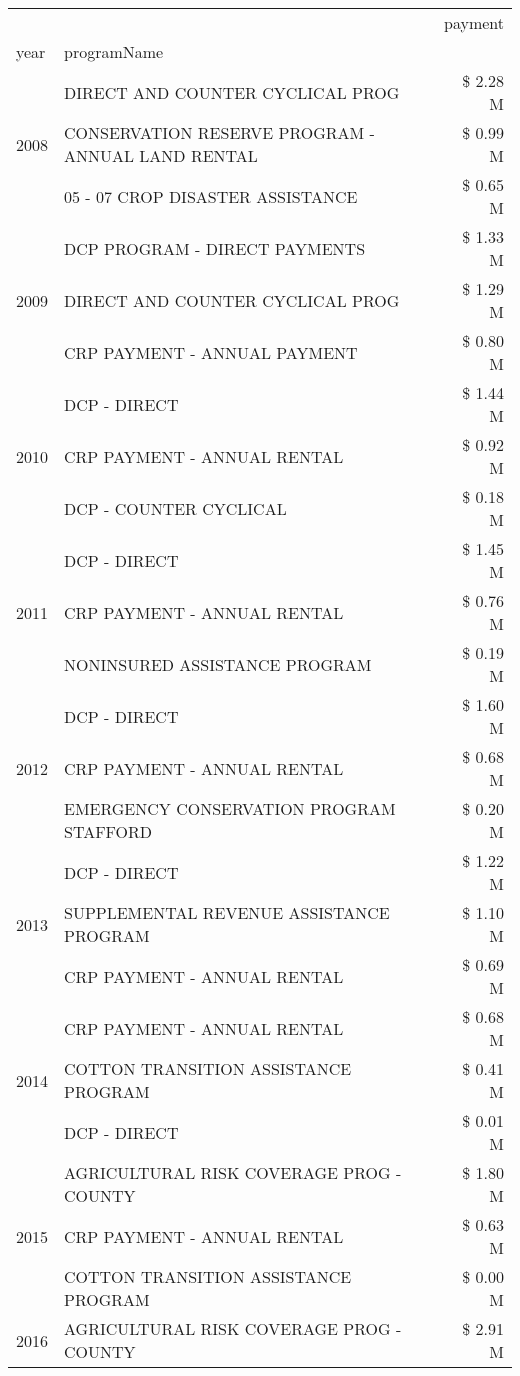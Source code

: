 \begin{tabular}{llr}
\toprule
 &  & payment \\
year & programName &  \\
\midrule
\multirow[t]{3}{*}{2008} & DIRECT AND COUNTER CYCLICAL PROG & \$ 2.28 M \\
 & CONSERVATION RESERVE PROGRAM - ANNUAL LAND RENTAL & \$ 0.99 M \\
 & 05 - 07 CROP DISASTER ASSISTANCE & \$ 0.65 M \\
\cline{1-3}
\multirow[t]{3}{*}{2009} & DCP PROGRAM - DIRECT PAYMENTS & \$ 1.33 M \\
 & DIRECT AND COUNTER CYCLICAL PROG & \$ 1.29 M \\
 & CRP PAYMENT - ANNUAL PAYMENT & \$ 0.80 M \\
\cline{1-3}
\multirow[t]{3}{*}{2010} & DCP - DIRECT & \$ 1.44 M \\
 & CRP PAYMENT - ANNUAL RENTAL & \$ 0.92 M \\
 & DCP - COUNTER CYCLICAL & \$ 0.18 M \\
\cline{1-3}
\multirow[t]{3}{*}{2011} & DCP - DIRECT & \$ 1.45 M \\
 & CRP PAYMENT - ANNUAL RENTAL & \$ 0.76 M \\
 & NONINSURED ASSISTANCE PROGRAM & \$ 0.19 M \\
\cline{1-3}
\multirow[t]{3}{*}{2012} & DCP - DIRECT & \$ 1.60 M \\
 & CRP PAYMENT - ANNUAL RENTAL & \$ 0.68 M \\
 & EMERGENCY CONSERVATION PROGRAM STAFFORD & \$ 0.20 M \\
\cline{1-3}
\multirow[t]{3}{*}{2013} & DCP - DIRECT & \$ 1.22 M \\
 & SUPPLEMENTAL REVENUE ASSISTANCE PROGRAM & \$ 1.10 M \\
 & CRP PAYMENT - ANNUAL RENTAL & \$ 0.69 M \\
\cline{1-3}
\multirow[t]{3}{*}{2014} & CRP PAYMENT - ANNUAL RENTAL & \$ 0.68 M \\
 & COTTON TRANSITION ASSISTANCE PROGRAM & \$ 0.41 M \\
 & DCP - DIRECT & \$ 0.01 M \\
\cline{1-3}
\multirow[t]{3}{*}{2015} & AGRICULTURAL RISK COVERAGE PROG - COUNTY & \$ 1.80 M \\
 & CRP PAYMENT - ANNUAL RENTAL & \$ 0.63 M \\
 & COTTON TRANSITION ASSISTANCE PROGRAM & \$ 0.00 M \\
\cline{1-3}
\multirow[t]{3}{*}{2016} & AGRICULTURAL RISK COVERAGE PROG - COUNTY & \$ 2.91 M \\

\end{tabular}
